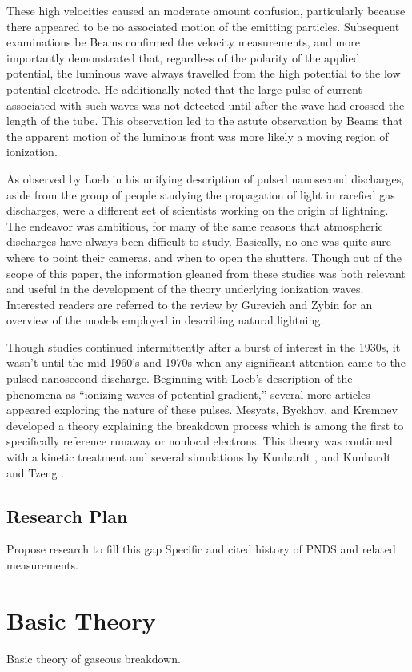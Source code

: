 These high velocities caused an moderate amount confusion, particularly because
there appeared to be no associated motion of the emitting particles. Subsequent
examinations be Beams \cite{Beams1930} confirmed the velocity measurements, and
more importantly demonstrated that, regardless of the polarity of the applied
potential, the luminous wave always travelled from the high potential to the low
potential electrode. He additionally noted that the large pulse of current
associated with such waves was not detected until after the wave had crossed the
length of the tube. This observation led to the astute observation by Beams that
the apparent motion of the luminous front was more likely a moving region of
ionization.

As observed by Loeb \cite{Loeb1965} in his unifying description of pulsed
nanosecond discharges, aside from the group of people studying the propagation
of light in rarefied gas discharges, were a different set of scientists working
on the origin of lightning. The endeavor was ambitious, for many of the same
reasons that atmospheric discharges have always been difficult to study.
Basically, no one was quite sure where to point their cameras, and when to open
the shutters. Though out of the scope of this paper, the information gleaned
from these studies was both relevant and useful in the development of the theory
underlying ionization waves. Interested readers are referred to the review by
Gurevich and Zybin \cite{Gurevich2001} for an overview of the models employed in
describing natural lightning.

Though studies continued intermittently after a burst of interest in the 1930s,
it wasn't until the mid-1960's and 1970s when any significant attention came to
the pulsed-nanosecond discharge. Beginning with Loeb's description of the
phenomena as ``ionizing waves of potential gradient,'' several more articles
appeared exploring the nature of these pulses. Mesyats, Byckhov, and Kremnev
\cite{Mesyats1972} developed a theory explaining the breakdown process which is
among the first to specifically reference runaway or nonlocal electrons. This
theory was continued with a kinetic treatment and several simulations by
Kunhardt \cite{Kunhardt1980}, and Kunhardt and Tzeng \cite{Kunhardt1988}.



\subsection{Research Plan}

Propose research to fill this gap
Specific and cited history of PNDS and related measurements.

\section{Basic Theory}

Basic theory of gaseous breakdown.
